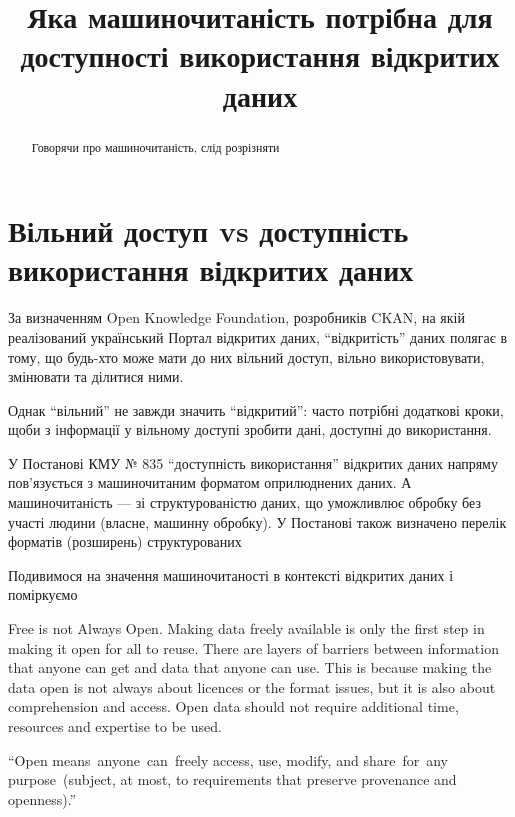 \documentclass[
]{agujournal2019}
\begin{document}
\title{Яка машиночитаність потрібна для доступності використання
відкритих даних}



\begin{abstract}
Говорячи про машиночитаність, слід розрізняти
\end{abstract}





\section{Вільний доступ vs доступність використання відкритих
даних}\label{ux432ux456ux43bux44cux43dux438ux439-ux434ux43eux441ux442ux443ux43f-vs-ux434ux43eux441ux442ux443ux43fux43dux456ux441ux442ux44c-ux432ux438ux43aux43eux440ux438ux441ux442ux430ux43dux43dux44f-ux432ux456ux434ux43aux440ux438ux442ux438ux445-ux434ux430ux43dux438ux445}

За визначенням Open Knowledge Foundation, розробників CKAN, на якій
реалізований український Портал відкритих даних, ``відкритість'' даних
полягає в тому, що будь-хто може мати до них вільний доступ, вільно
використовувати, змінювати та ділитися ними.

Однак ``вільний'' не завжди значить ``відкритий'': часто потрібні
додаткові кроки, щоби з інформації у вільному доступі зробити дані,
доступні до використання.

У Постанові КМУ № 835 ``доступність використання'' відкритих даних
напряму пов'язується з машиночитаним форматом оприлюднених даних. А
машиночитаність --- зі структурованістю даних, що уможливлює обробку без
участі людини (власне, машинну обробку). У Постанові також визначено
перелік форматів (розширень) структурованих

Подивимося на значення машиночитаності в контексті відкритих даних і
поміркуємо

Free is not Always Open. Making data freely available is only the first
step in making it open for all to reuse. There are layers of barriers
between information that anyone can get and data that anyone can use.
This is because making the data open is not always about licences or the
format issues, but it is also about comprehension and access. Open data
should not require additional time, resources and expertise to be used.

``Open means~anyone~can~freely access, use, modify, and share~for~any
purpose~(subject, at most, to requirements that preserve provenance and
openness).''
\end{document}
